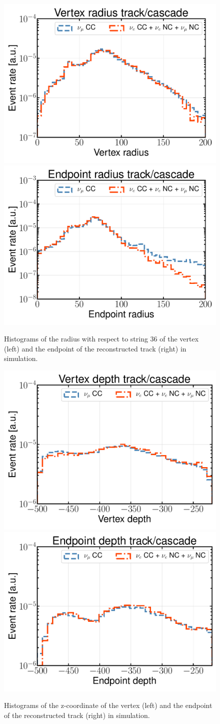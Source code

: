 \begin{figure}
    \centering
    \includegraphics[width=0.49\linewidth]{figures/icecube/classification/variables/rho36_start.pdf}
    \includegraphics[width=0.49\linewidth]{figures/icecube/classification/variables/rho36_end.pdf}
    \caption{Histograms of the radius with respect to string 36 of the vertex (left) and the endpoint of the reconstructed track (right) in simulation.}
    \label{fig:apx-pidvars-rho36}
\end{figure}

\begin{figure}
    \centering
    \includegraphics[width=0.49\linewidth]{figures/icecube/classification/variables/z_start.pdf}
    \includegraphics[width=0.49\linewidth]{figures/icecube/classification/variables/z_end.pdf}
    \caption{Histograms of the z-coordinate of the vertex (left) and the endpoint of the reconstructed track (right) in simulation.}
    \label{fig:apx-pidvars-z}
\end{figure}

